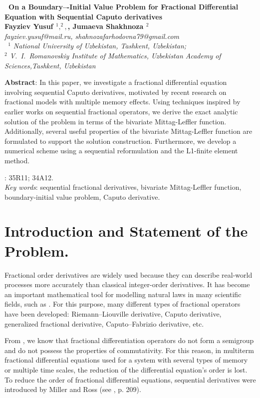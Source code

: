 \documentclass{amsart}
\numberwithin{equation}{section}
\begin{document}
\begin{center}
\textbf{{\large {\ On a Boundary–-Initial Value Problem for
Fractional Differential Equation with
Sequential Caputo derivatives }}}\\
\medskip \textbf{Fayziev Yusuf $^{1},^{2},$, Jumaeva Shakhnoza $^{2}$}\\
\textit{fayziev.yusuf@mail.ru,     shahnozafarhodovna79@gmail.com}\\
\medskip \textit{\ $^{1}$ National University of Uzbekistan, Tashkent, Uzbekistan; \\ $^{2}$ V.~I.~Romanovskiy Institute of Mathematics, Uzbekistan Academy of Sciences,Tashkent, Uzbekistan }
\end{center}

\textbf{Abstract}: In this paper, we investigate a fractional differential equation involving sequential Caputo derivatives, motivated by recent research on fractional models with multiple memory effects. Using techniques inspired by earlier works on sequential fractional operators, we derive the exact analytic solution of the problem in terms of the bivariate Mittag-Leffler function. Additionally, several useful properties of the bivariate Mittag-Leffler function are formulated to support the solution construction. Furthermore, we develop a numerical scheme using a sequential reformulation and the L1-finite element method.

\vskip 0.3cm  : 35R11; 34A12.\\
{\it Key words}: sequential fractional derivatives, bivariate Mittag-Leffler function, boundary-initial value problem, Caputo derivative.

\section{Introduction and Statement of the Problem.}\label{jumaeva:sec:1}

Fractional order derivatives are widely used because they can describe real-world processes more accurately than classical integer-order derivatives. It has become an important mathematical tool for modelling natural laws in many scientific fields, such as \cite{jumaeva:ref:1,jumaeva:ref:2,jumaeva:ref:3}. 
For this purpose, many different types of fractional operators have been developed: Riemann–Liouville derivative, Caputo derivative, generalized fractional derivative, Caputo–Fabrizio derivative, etc. 

From \cite{jumaeva:ref:4}, we know that fractional differentiation operators do not form a semigroup and do not possess the properties of commutativity. For this reason, in multiterm fractional differential equations used for a system with several types of memory or multiple time scales, the reduction of the differential equation’s order is lost. To reduce the order of fractional differential equations, sequential derivatives were introduced by Miller and Ross (see \cite{jumaeva:ref:4}, p. 209).
\end{document}
